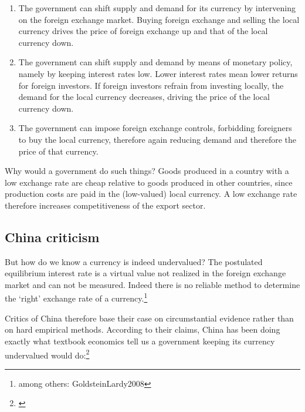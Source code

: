 \documentclass[11pt]{article}
\begin{document}
\begin{enumerate}
\item{The government can shift supply and demand for its currency by intervening on the foreign exchange market. Buying foreign exchange and selling the local currency drives the price of foreign exchange up and that of the local currency down.}
\item{The government can shift supply and demand by means of monetary policy, namely by keeping interest rates low. Lower interest rates mean lower returns for foreign investors. If foreign investors refrain from investing locally, the demand for the local currency decreases, driving the price of the local currency down.}
\item{The government can impose foreign exchange controls, forbidding foreigners to buy the local currency, therefore again reducing demand and therefore the price of that currency.}
\end{enumerate}

Why would a government do such things? Goods produced in a country with a low exchange rate are cheap relative to goods produced in other countries, since production costs are paid in the (low-valued) local currency. A low exchange rate therefore increases competitiveness of the export sector. 





\subsection{China criticism}

But how do we know a currency is indeed undervalued? The postulated equilibrium interest rate is a virtual value not realized in the foreign exchange market and can not be measured. Indeed there is no reliable method to determine the `right' exchange rate of a currency.\footnote{among others: \cite{pp. 4}{GoldsteinLardy2008}}

Critics of China therefore base their case on circumstantial evidence rather than on hard empirical methods. %
According to their claims, China has been doing exactly what textbook economics tell us a government keeping its currency undervalued would do:\footnote{\cite[pp. 40]{GoldsteinLardy2008}}
\end{document}
